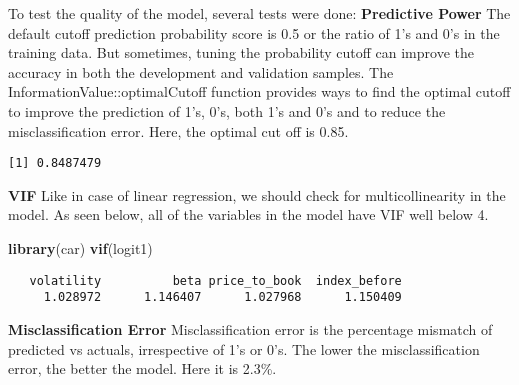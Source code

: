 \documentclass[12pt,twoside]{reedthesis}
\newenvironment{Shaded}{\begin{snugshade}}{\end{snugshade}}
\newcommand{\KeywordTok}[1]{\textcolor[rgb]{0.13,0.29,0.53}{\textbf{{#1}}}}
\newcommand{\DecValTok}[1]{\textcolor[rgb]{0.00,0.00,0.81}{{#1}}}
\newcommand{\StringTok}[1]{\textcolor[rgb]{0.31,0.60,0.02}{{#1}}}
\newcommand{\NormalTok}[1]{{#1}}
\theoremstyle{definition}
\theoremstyle{definition}
\theoremstyle{definition}
\theoremstyle{remark}
\begin{document}
To test the quality of the model, several tests were done: \hfill\break
\textbf{Predictive Power} \hfill\break
The default cutoff prediction probability score is 0.5 or the ratio of
1's and 0's in the training data. But sometimes, tuning the probability
cutoff can improve the accuracy in both the development and validation
samples. The InformationValue::optimalCutoff function provides ways to
find the optimal cutoff to improve the prediction of 1's, 0's, both 1's
and 0's and to reduce the misclassification error. Here, the optimal cut
off is 0.85.
\begin{Shaded}
\end{Shaded}
\begin{verbatim}
[1] 0.8487479
\end{verbatim}
\hfill\break
\textbf{VIF} \hfill\break
Like in case of linear regression, we should check for multicollinearity
in the model. As seen below, all of the variables in the model have VIF
well below 4.
\begin{Shaded}
\begin{Highlighting}[]
\KeywordTok{library}\NormalTok{(car)}
\KeywordTok{vif}\NormalTok{(logit1)}
\end{Highlighting}
\end{Shaded}
\begin{verbatim}
   volatility          beta price_to_book  index_before 
     1.028972      1.146407      1.027968      1.150409 
\end{verbatim}
\hfill\break
\textbf{Misclassification Error} \hfill\break
Misclassification error is the percentage mismatch of predicted vs
actuals, irrespective of 1's or 0's. The lower the misclassification
error, the better the model. Here it is 2.3\%.
\begin{Shaded}
\end{Shaded}
\end{document}
